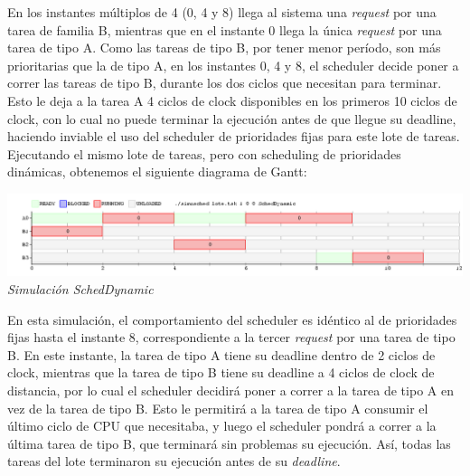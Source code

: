 En los instantes m\'ultiplos de 4 (0, 4 y 8) llega al sistema una \textit{request} por una tarea de familia B, mientras que en el instante 0 llega la \'unica 
\textit{request} por una tarea de tipo A. Como las tareas de tipo B, por tener menor per\'iodo, son m\'as prioritarias que la de tipo A, en los instantes
0, 4 y 8, el scheduler decide poner a correr las tareas de tipo B, durante los dos ciclos que necesitan para terminar. Esto le deja a la tarea A
4 ciclos de clock disponibles en los primeros 10 ciclos de clock, con lo cual no puede terminar la ejecuci\'on antes de que llegue su deadline,
haciendo inviable el uso del scheduler de prioridades fijas para este lote de tareas.
\\
Ejecutando el mismo lote de tareas, pero con scheduling de prioridades din\'amicas, obtenemos el siguiente diagrama de Gantt:

\vspace{\baselineskip}
\begin{center}
\includegraphics[scale=0.45]{../tp1/Test/ejercicio9-2.png}
\\
\vspace{1pt}
\footnotesize\textit{Simulaci\'on SchedDynamic}
\end{center}
\vspace{\baselineskip}

En esta simulaci\'on, el comportamiento del scheduler es id\'entico al de prioridades fijas hasta el instante 8, correspondiente a la tercer \textit{request}
por una tarea de tipo B. En este instante, la tarea de tipo A tiene su deadline dentro de 2 ciclos de clock, mientras que la tarea de tipo B tiene
su deadline a 4 ciclos de clock de distancia, por lo cual el scheduler decidir\'a poner a correr a la tarea de tipo A en vez de la tarea de tipo B.
Esto le permitir\'a a la tarea de tipo A consumir el \'ultimo ciclo de CPU que necesitaba, y luego el scheduler pondr\'a a correr a la \'ultima
tarea de tipo B, que terminar\'a sin problemas su ejecuci\'on. As\'i, todas las tareas del lote terminaron su ejecuci\'on antes de su \textit{deadline}.
